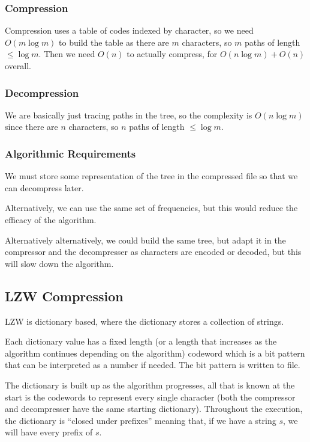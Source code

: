 \subsubsection{Compression}\label{ssub:compression}

Compression uses a table of codes indexed by character, so we need \(O(m \log m)\) to build the table as there are \(m\) characters, so \(m\) paths of length \(\leq \log m\).
Then we need \(O(n)\) to actually compress, for \(O(n \log m) + O(n)\) overall.

\subsubsection{Decompression}\label{ssub:decompression}

We are basically just tracing paths in the tree, so the complexity is \(O(n \log m)\) since there are \(n\) characters, so \(n\) paths of length \(\leq \log m\).

\subsubsection{Algorithmic Requirements}\label{ssub:algorithmic_requirements}

We must store some representation of the tree in the compressed file so that we can decompress later.

Alternatively, we can use the same set of frequencies, but this would reduce the efficacy of the algorithm.

Alternatively alternatively, we could build the same tree, but adapt it in the compressor and the decompresser as characters are encoded or decoded, but this will slow down the algorithm.

\subsection{LZW Compression}\label{sub:lzw_compression}

LZW is dictionary based, where the dictionary stores a collection of strings.

Each dictionary value has a fixed length (or a length that increases as the algorithm continues depending on the algorithm) codeword which is a bit pattern that can be interpreted as a number if needed.
The bit pattern is written to file.

The dictionary is built up as the algorithm progresses, all that is known at the start is the codewords to represent every single character (both the compressor and decompresser have the same starting dictionary).
Throughout the execution, the dictionary is ``closed under prefixes'' meaning that, if we have a string \(s\), we will have every prefix of \(s\).

